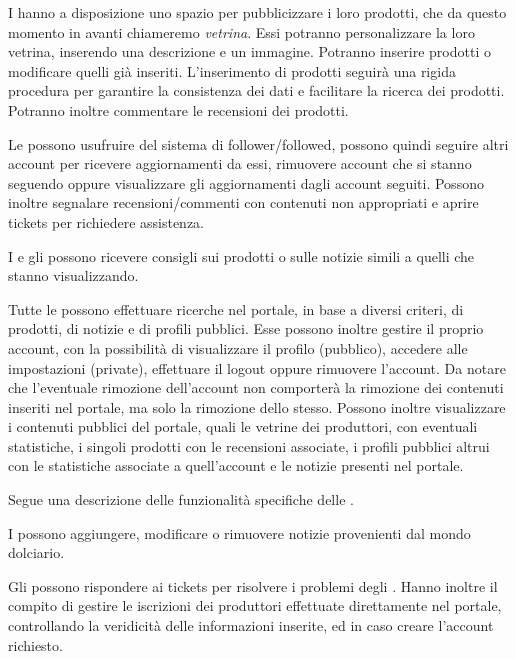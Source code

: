 I  hanno a disposizione uno spazio per pubblicizzare i loro prodotti, che da questo momento in avanti chiameremo \emph{vetrina}. Essi potranno personalizzare la loro vetrina, inserendo una descrizione e un immagine. Potranno inserire prodotti o modificare quelli già inseriti. L'inserimento di prodotti seguirà una rigida procedura per garantire la consistenza dei dati e facilitare la ricerca dei prodotti. Potranno inoltre commentare le recensioni dei prodotti.

\bigskip
Le  possono usufruire del sistema di follower/followed, possono quindi seguire altri account per ricevere aggiornamenti da essi, rimuovere account che si stanno seguendo oppure visualizzare gli aggiornamenti dagli account seguiti. Possono inoltre segnalare recensioni/commenti con contenuti non appropriati e aprire tickets per richiedere assistenza.

I  e gli  possono ricevere consigli sui prodotti o sulle notizie simili a quelli che stanno visualizzando. 

Tutte le  possono effettuare ricerche nel portale, in base a diversi criteri, di prodotti, di notizie e di profili pubblici.
Esse possono inoltre gestire il proprio account, con la possibilità di visualizzare il profilo (pubblico), accedere alle impostazioni (private), effettuare il logout oppure rimuovere l'account. Da notare che l'eventuale rimozione dell'account non comporterà la rimozione dei contenuti inseriti nel portale, ma solo la rimozione dello stesso. Possono inoltre visualizzare i contenuti pubblici del portale, quali le vetrine dei produttori, con eventuali statistiche, i singoli prodotti con le recensioni associate, i profili pubblici altrui con le statistiche associate a quell'account e le notizie presenti nel portale.

\bigskip
\noindent
Segue una descrizione delle funzionalità specifiche delle .

I  possono aggiungere, modificare o rimuovere notizie provenienti dal mondo dolciario.

Gli  possono rispondere ai tickets per risolvere i problemi degli . Hanno inoltre il compito di gestire le iscrizioni dei produttori effettuate direttamente nel portale, controllando la veridicità delle informazioni inserite, ed in caso creare l'account richiesto.

